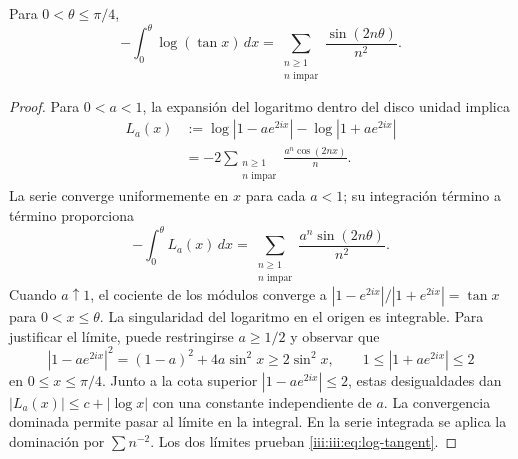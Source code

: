 \begin{lemma}
\label{iii:iii:lem:log-tangent}
Para $0<\theta\leq\pi/4$,
\begin{equation}
 -\int_0^\theta\log(\tan x)\,dx
 =\sum_{\substack{n\geq1\\n\text{ impar}}}
      \frac{\sin(2n\theta)}{n^2}.
 \label{iii:iii:eq:log-tangent}
\end{equation}
\end{lemma}
\begin{proof}
Para $0<a<1$, la expansión del logaritmo dentro del disco unidad implica
\begin{align*}
 L_a(x)
 &:=\log|1-ae^{2ix}|-\log|1+ae^{2ix}|\\
 &=-2\sum_{\substack{n\geq1\\n\text{ impar}}}
       \frac{a^n\cos(2nx)}{n}.
\end{align*}
La serie converge uniformemente en $x$ para cada $a<1$; su integración
término a término proporciona
\[
 -\int_0^\theta L_a(x)\,dx
 =\sum_{\substack{n\geq1\\n\text{ impar}}}
       \frac{a^n\sin(2n\theta)}{n^2}.
\]
Cuando $a\uparrow1$, el cociente de los módulos converge a
$|1-e^{2ix}|/|1+e^{2ix}|=\tan x$ para $0<x\leq\theta$.
La singularidad del logaritmo en el origen es integrable. Para justificar
el límite, puede restringirse $a\geq1/2$ y observar que
\[
 |1-ae^{2ix}|^2=(1-a)^2+4a\sin^2x
 \geq2\sin^2x,
 \qquad 1\leq|1+ae^{2ix}|\leq2
\]
en $0\leq x\leq\pi/4$. Junto a la cota superior
$|1-ae^{2ix}|\leq2$, estas desigualdades dan
$|L_a(x)|\leq c+|\log x|$ con una constante independiente de $a$.
La convergencia dominada permite pasar al límite en la integral.
En la serie integrada se aplica la dominación por $\sum n^{-2}$.
Los dos límites prueban \eqref{iii:iii:eq:log-tangent}.
\end{proof}

